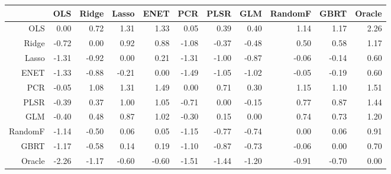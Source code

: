 \begin{table}[ht]
\centering
\begin{tabular}{rrrrrrrrrrr}
  \hline
 & OLS & Ridge & Lasso & ENET & PCR & PLSR & GLM & RandomF & GBRT & Oracle \\ 
  \hline
OLS & 0.00 & 0.72 & 1.31 & 1.33 & 0.05 & 0.39 & 0.40 & 1.14 & 1.17 & 2.26 \\ 
  Ridge & -0.72 & 0.00 & 0.92 & 0.88 & -1.08 & -0.37 & -0.48 & 0.50 & 0.58 & 1.17 \\ 
  Lasso & -1.31 & -0.92 & 0.00 & 0.21 & -1.31 & -1.00 & -0.87 & -0.06 & -0.14 & 0.60 \\ 
  ENET & -1.33 & -0.88 & -0.21 & 0.00 & -1.49 & -1.05 & -1.02 & -0.05 & -0.19 & 0.60 \\ 
  PCR & -0.05 & 1.08 & 1.31 & 1.49 & 0.00 & 0.71 & 0.30 & 1.15 & 1.10 & 1.51 \\ 
  PLSR & -0.39 & 0.37 & 1.00 & 1.05 & -0.71 & 0.00 & -0.15 & 0.77 & 0.87 & 1.44 \\ 
  GLM & -0.40 & 0.48 & 0.87 & 1.02 & -0.30 & 0.15 & 0.00 & 0.74 & 0.73 & 1.20 \\ 
  RandomF & -1.14 & -0.50 & 0.06 & 0.05 & -1.15 & -0.77 & -0.74 & 0.00 & 0.06 & 0.91 \\ 
  GBRT & -1.17 & -0.58 & 0.14 & 0.19 & -1.10 & -0.87 & -0.73 & -0.06 & 0.00 & 0.70 \\ 
  Oracle & -2.26 & -1.17 & -0.60 & -0.60 & -1.51 & -1.44 & -1.20 & -0.91 & -0.70 & 0.00 \\ 
   \hline
\end{tabular}
\end{table}

